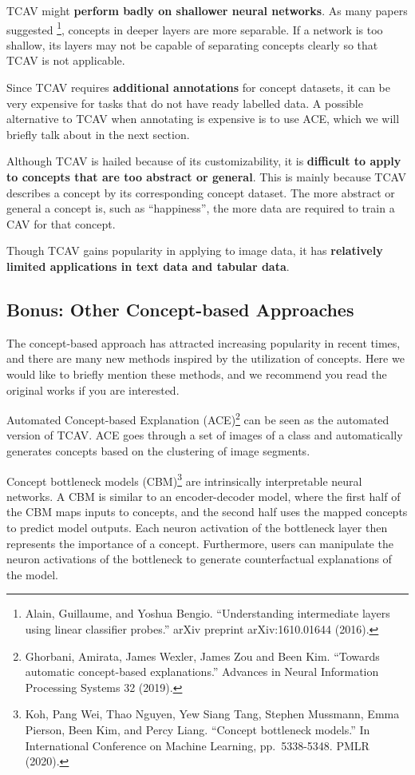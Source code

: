 \documentclass[
  10pt,
]{scrbook}
\begin{document}
TCAV might \textbf{perform badly on shallower neural networks}.
As many papers suggested \footnote{Alain, Guillaume, and Yoshua Bengio. ``Understanding intermediate layers using linear classifier probes.'' arXiv preprint arXiv:1610.01644 (2016).}, concepts in deeper layers are more separable.
If a network is too shallow, its layers may not be capable of separating concepts clearly so that TCAV is not applicable.

Since TCAV requires \textbf{additional annotations} for concept datasets, it can be very expensive for tasks that do not have ready labelled data.
A possible alternative to TCAV when annotating is expensive is to use ACE, which we will briefly talk about in the next section.

Although TCAV is hailed because of its customizability, it is \textbf{difficult to apply to concepts that are too abstract or general}.
This is mainly because TCAV describes a concept by its corresponding concept dataset.
The more abstract or general a concept is, such as ``happiness'', the more data are required to train a CAV for that concept.

Though TCAV gains popularity in applying to image data, it has \textbf{relatively limited applications in text data and tabular data}.

\hypertarget{bonus-other-concept-based-approaches}{%
\subsection{Bonus: Other Concept-based Approaches}\label{bonus-other-concept-based-approaches}}

The concept-based approach has attracted increasing popularity in recent times, and there are many new methods inspired by the utilization of concepts. Here we would like to briefly mention these methods, and we recommend you read the original works if you are interested.

Automated Concept-based Explanation (ACE)\footnote{Ghorbani, Amirata, James Wexler, James Zou and Been Kim. ``Towards automatic concept-based explanations.'' Advances in Neural Information Processing Systems 32 (2019).} can be seen as the automated version of TCAV.
ACE goes through a set of images of a class and automatically generates concepts based on the clustering of image segments.

Concept bottleneck models (CBM)\footnote{Koh, Pang Wei, Thao Nguyen, Yew Siang Tang, Stephen Mussmann, Emma Pierson, Been Kim, and Percy Liang. ``Concept bottleneck models.'' In International Conference on Machine Learning, pp.~5338-5348. PMLR (2020).} are intrinsically interpretable neural networks.
A CBM is similar to an encoder-decoder model, where the first half of the CBM maps inputs to concepts, and the second half uses the mapped concepts to predict model outputs.
Each neuron activation of the bottleneck layer then represents the importance of a concept.
Furthermore, users can manipulate the neuron activations of the bottleneck to generate counterfactual explanations of the model.
\end{document}
